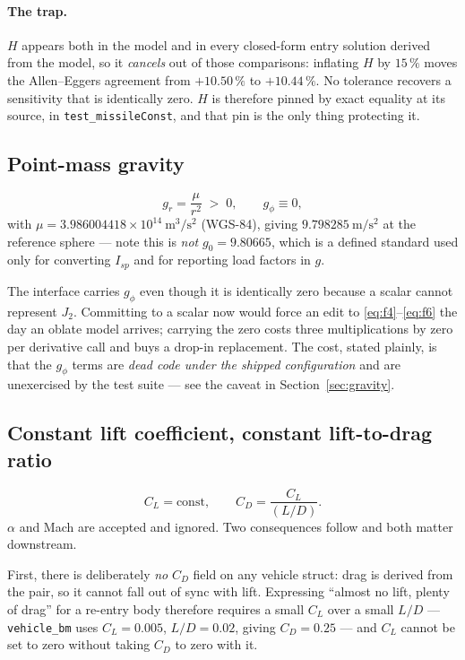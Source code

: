 \documentclass[11pt]{article}
\newcommand{\code}[1]{\texttt{#1}}
\begin{document}
\paragraph{The trap.} $H$ appears both in the model and in every closed-form
entry solution derived from the model, so it \emph{cancels} out of those
comparisons: inflating $H$ by $15\,\%$ moves the Allen--Eggers agreement from
$+10.50\,\%$ to $+10.44\,\%$. No tolerance recovers a sensitivity that is
identically zero. $H$ is therefore pinned by exact equality at its source, in
\code{test\_missileConst}, and that pin is the only thing protecting it.

\subsection{Point-mass gravity}

\begin{equation}
  g_r = \frac{\mu}{r^2} \;>\; 0 , \qquad g_\phi \equiv 0 ,
  \label{eq:grav}
\end{equation}
with $\mu = 3.986004418\times10^{14}~\mathrm{m^3/s^2}$ (WGS-84), giving
$9.798285~\mathrm{m/s^2}$ at the reference sphere --- note this is
\emph{not} $g_0 = 9.80665$, which is a defined standard used only for
converting $I_{sp}$ and for reporting load factors in $g$.

The interface carries $g_\phi$ even though it is identically zero because a
scalar cannot represent $J_2$. Committing to a scalar now would force an edit
to \eqref{eq:f4}--\eqref{eq:f6} the day an oblate model arrives; carrying the
zero costs three multiplications by zero per derivative call and buys a drop-in
replacement. The cost, stated plainly, is that the $g_\phi$ terms are
\emph{dead code under the shipped configuration} and are unexercised by the
test suite --- see the caveat in Section~\ref{sec:gravity}.

\subsection{Constant lift coefficient, constant lift-to-drag ratio}

\begin{equation}
  C_L = \text{const}, \qquad C_D = \frac{C_L}{(L/D)} .
  \label{eq:aero}
\end{equation}
$\alpha$ and Mach are accepted and ignored. Two consequences follow and both
matter downstream.

First, there is deliberately \emph{no} $C_D$ field on any vehicle struct: drag
is derived from the pair, so it cannot fall out of sync with lift. Expressing
``almost no lift, plenty of drag'' for a re-entry body therefore requires a
small $C_L$ over a small $L/D$ --- \code{vehicle\_bm} uses
$C_L=0.005$, $L/D=0.02$, giving $C_D = 0.25$ --- and $C_L$ cannot be set to
zero without taking $C_D$ to zero with it.
\end{document}
